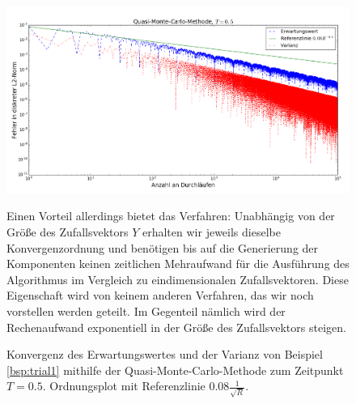 \begin{figure}
\includegraphics[width=\textwidth]{Figures/quasi_mc_convergence_trial1.png}
\caption{Konvergenz des Erwartungswertes und der Varianz von Beispiel \ref{bsp:trial1} mithilfe der Quasi-Monte-Carlo-Methode zum Zeitpunkt $T=0.5$. Ordnungsplot mit Referenzlinie $0.08\frac{1}{\sqrt{R}}$.}
Einen Vorteil allerdings bietet das Verfahren: Unabhängig von der Größe des Zufallsvektors $Y$ erhalten wir jeweils dieselbe Konvergenzordnung und benötigen bis auf die Generierung der Komponenten keinen zeitlichen Mehraufwand für die Ausführung des Algorithmus im Vergleich zu eindimensionalen Zufallsvektoren. Diese Eigenschaft wird von keinem anderen Verfahren, das wir noch vorstellen werden geteilt. Im Gegenteil nämlich wird der Rechenaufwand exponentiell in der Größe des Zufallsvektors steigen. 
\label{fig:quasi_mc_convergence_trial1}
\end{figure}


